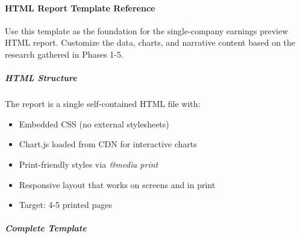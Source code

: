 \documentclass[11pt]{article}
\begin{document}
\paragraph{HTML Report Template Reference}\mbox{}\par

Use this template as the foundation for the single-company earnings preview HTML report. Customize the data, charts, and narrative content based on the research gathered in Phases 1-5.


\subparagraph{HTML Structure}\mbox{}\par

The report is a single self-contained HTML file with:

\begin{itemize}[leftmargin=*,itemsep=2pt,topsep=2pt]
\item {} Embedded CSS (no external stylesheets)
\item {} Chart.js loaded from CDN for interactive charts
\item {} Print-friendly styles via \emph{@media print}
\item {} Responsive layout that works on screens and in print
\item {} Target: 4-5 printed pages
\end{itemize}

\subparagraph{Complete Template}\mbox{}\par
\end{document}
